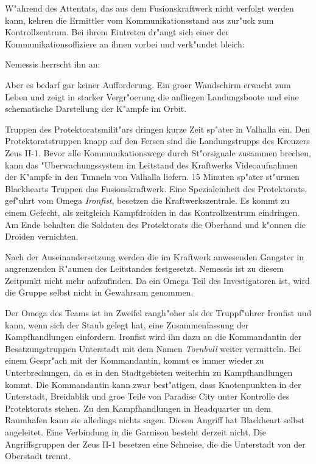
W"ahrend des Attentats, das aus dem Fusionskraftwerk nicht verfolgt werden kann, kehren die Ermittler vom Kommunikationsstand aus zur"uck zum Kontrollzentrum. Bei ihrem Eintreten dr"angt sich einer der Kommunikationsoffiziere an ihnen vorbei und verk"undet bleich:

 Nemessis herrscht ihn an: 

Aber es bedarf gar keiner Aufforderung. Ein gro\3er Wandschirm erwacht zum Leben und zeigt in starker Vergr"o\3erung die anfliegen Landungsboote und eine schematische Darstellung der K"ampfe im Orbit.

Truppen des Protektoratsmilit"ars dringen kurze Zeit sp"ater in Valhalla ein. Den Protektoratstruppen knapp auf den Fersen sind die Landungstrupps des Kreuzers Zeus II-1. Bevor alle Kommunikationswege durch St"orsignale zusammen brechen, kann das "Uberwachungssystem im Leitstand des Kraftwerks Videoaufnahmen der K"ampfe in den Tunneln von Valhalla liefern. 15 Minuten sp"ater st"urmen Blackhearts Truppen das Fusionskraftwerk. Eine Spezialeinheit des Protektorats, gef"uhrt vom Omega \emph{Ironfist}, besetzen die Kraftwerkszentrale. Es kommt zu einem Gefecht, als zeitgleich Kampfdroiden in das Kontrollzentrum eindringen. Am Ende behalten die Soldaten des Protektorats die Oberhand und k"onnen die Droiden vernichten. 

Nach der Auseinandersetzung werden die im Kraftwerk anwesenden Gangster in angrenzenden R"aumen des Leitstandes festgesetzt. Nemessis ist zu diesem Zeitpunkt nicht mehr aufzufinden. Da ein Omega Teil des Investigatoren ist, wird die Gruppe selbst nicht in Gewahrsam genommen. 

Der Omega des Teams ist im Zweifel rangh"oher als der Truppf"uhrer Ironfist und kann, wenn sich der Staub gelegt hat, eine Zusammenfassung der Kampfhandlungen einfordern. Ironfist wird ihn dazu an die Kommandantin der Besatzungstruppen Unterstadt mit dem Namen \emph{Tornbull} weiter vermitteln. Bei einem Gespr"ach mit der Kommandantin, kommt es immer wieder zu Unterbrechungen, da es in den Stadtgebieten weiterhin zu Kampfhandlungen kommt. Die Kommandantin kann zwar best"atigen, dass Knotenpunkten in der Unterstadt, Breidablik und gro\3e Teile von Paradise City unter Kontrolle des Protektorats stehen. Zu den Kampfhandlungen in Headquarter un dem Raumhafen kann sie alledings nichts sagen. Diesen Angriff hat Blackheart selbst angeleitet. Eine Verbindung in die Garnison besteht derzeit nicht. Die Angriffsgruppen der Zeus II-1 besetzen eine Schneise, die die Unterstadt von der Oberstadt trennt.

